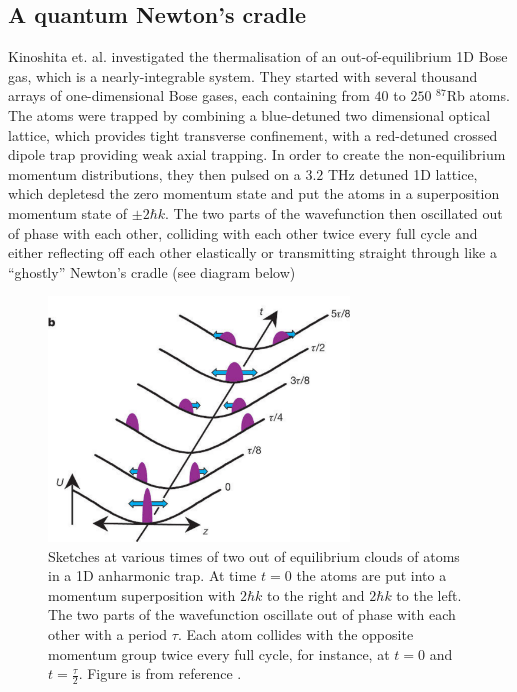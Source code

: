 \documentclass[a4paper,10pt]{article}
\begin{document}
\subsection{A quantum Newton's cradle}
Kinoshita et. al. investigated \cite{Kinoshita2006} the thermalisation of an out-of-equilibrium 1D Bose gas, which is a  nearly-integrable system. They started with
several thousand arrays of one-dimensional Bose gases, each containing from $40$ to $250$ $^{87}$Rb atoms. The atoms were trapped by combining a blue-detuned  two dimensional optical lattice, which provides tight transverse confinement, with a red-detuned crossed dipole trap  
providing weak axial trapping. In order to create the non-equilibrium momentum distributions, they then pulsed on a $3.2$ THz detuned 1D lattice, which depletesd the zero momentum state
and put the atoms in a superposition momentum state of $\pm2\hbar k$. The two parts of the wavefunction then oscillated out of phase with each other, colliding with each other twice every full cycle
and either reflecting off each other elastically or transmitting straight through like a ``ghostly'' Newton's cradle (see diagram below)

\begin{figure}[H]
 \begin{center}
 \includegraphics[width=8cm]{quantum_newtons_cradle}
 \end{center}
 \caption{Sketches at various times of two out of equilibrium
clouds of atoms in a 1D anharmonic trap. At time $t=0$ the atoms are put into a momentum superposition with $2\hbar k$ to the right and $2\hbar k$ to the left. The two parts of the 
wavefunction oscillate out of phase with each other with a period $\tau$. Each atom collides with the opposite momentum group
twice every full cycle, for instance, at $t=0$ and $t=\frac{\tau}{2}$. Figure is from reference \cite{Kinoshita2006}.}
 \end{figure}
 
\end{document}
